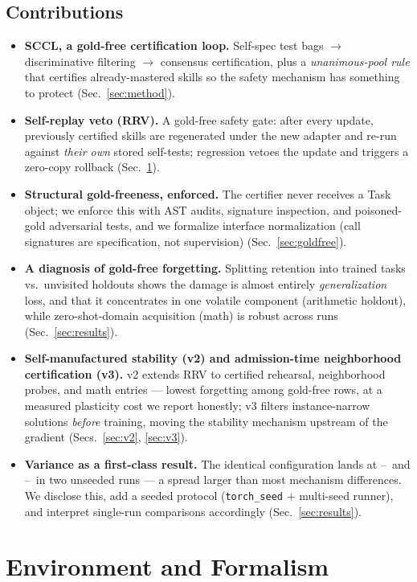 \documentclass[10pt,conference]{IEEEtran}
\newcommand{\scclacc}{--}\newcommand{\scclbwt}{--}\newcommand{\scclfwt}{--}%
\newcommand{\vtwoscclacc}{--}\newcommand{\vtwoscclbwt}{--}\newcommand{\vtwoscclforget}{--}\newcommand{\vtwoscclfrontier}{--}%
\begin{document}
\subsection{Contributions}
\begin{itemize}
\item \textbf{SCCL, a gold-free certification loop.} Self-spec test bags $\to$ discriminative filtering $\to$ consensus certification, plus a \emph{unanimous-pool rule} that certifies already-mastered skills so the safety mechanism has something to protect (Sec.~\ref{sec:method}).
\item \textbf{Self-replay veto (RRV).} A gold-free safety gate: after every update, previously certified skills are regenerated under the new adapter and re-run against \emph{their own} stored self-tests; regression vetoes the update and triggers a zero-copy rollback (Sec.~\ref{sec:env}).
\item \textbf{Structural gold-freeness, enforced.} The certifier never receives a Task object; we enforce this with AST audits, signature inspection, and poisoned-gold adversarial tests, and we formalize interface normalization (call signatures are specification, not supervision) (Sec.~\ref{sec:goldfree}).
\item \textbf{A diagnosis of gold-free forgetting.} Splitting retention into trained tasks vs.\ unvisited holdouts shows the damage is almost entirely \emph{generalization} loss, and that it concentrates in one volatile component (arithmetic holdout), while zero-shot-domain acquisition (math) is robust across runs (Sec.~\ref{sec:results}).
\item \textbf{Self-manufactured stability (v2) and admission-time neighborhood certification (v3).} v2 extends RRV to certified rehearsal, neighborhood probes, and math entries --- lowest forgetting among gold-free rows, at a measured plasticity cost we report honestly; v3 filters instance-narrow solutions \emph{before} training, moving the stability mechanism upstream of the gradient (Secs.~\ref{sec:v2}, \ref{sec:v3}).
\item \textbf{Variance as a first-class result.} The identical configuration lands at \scclacc\ and \vtwoscclacc\ in two unseeded runs --- a spread larger than most mechanism differences. We disclose this, add a seeded protocol (\texttt{torch\_seed} $+$ multi-seed runner), and interpret single-run comparisons accordingly (Sec.~\ref{sec:results}).
\end{itemize}

\section{Environment and Formalism}
\label{sec:env}
\end{document}
